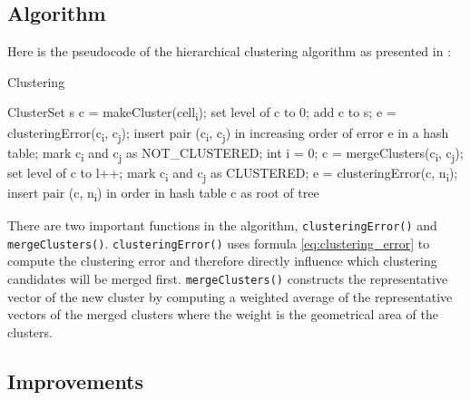 \subsection{Algorithm}

Here is the pseudocode of the hierarchical clustering algorithm as presented in \citet{Telea99}:

\begin{algorithm}[H]
\caption{Clustering}
\begin{algorithmic}[1]

\Require ClusterSet s
\Statex
{}
	\State c = makeCluster(cell\textsubscript{i});
    \State set level of c to 0;
    \State add c to s;
\EndFor
\Statex
{}
    	\State e = clusteringError(c\textsubscript{i}, c\textsubscript{j});
        \State insert pair (c\textsubscript{i}, c\textsubscript{j}) in increasing order of error e in a hash table;
        \State mark c\textsubscript{i} and c\textsubscript{j} as NOT\_CLUSTERED;
    \EndFor
\EndFor
\Statex
\State int i = 0;
    	\State c = mergeClusters(c\textsubscript{i}, c\textsubscript{j});
        set level of c to l++;
        mark c\textsubscript{i} and c\textsubscript{j} as CLUSTERED;
        	\State e = clusteringError(c, n\textsubscript{i});
            insert pair (c, n\textsubscript{i}) in order in hash table
        \EndFor
    \EndIf
\EndFor
\Statex
\Return c as root of tree
\end{algorithmic}
\end{algorithm}

There are two important functions in the algorithm, \texttt{clusteringError()} and \texttt{mergeClusters()}. \texttt{clusteringError()} uses formula \ref{eq:clustering_error} to compute the clustering error and therefore directly influence which clustering candidates will be merged first. \texttt{mergeClusters()} constructs the representative vector of the new cluster by computing a weighted average of the representative vectors of the merged clusters where the weight is the geometrical area of the clusters.
\subsection{Improvements}

